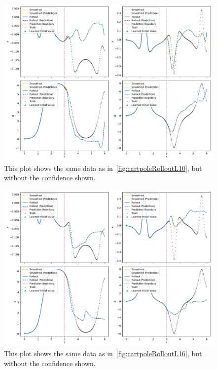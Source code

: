	\begin{figure}
		\centering
		\includegraphics[width=\linewidth]{figures/results/cartpole-gym/run-latent-dim-10/without-confidence/rollout-observations-N0.pdf}
		\caption{This plot shows the same data as in~\autoref{fig:cartpoleRolloutL10}, but without the confidence shown.}
		\label{fig:cartpoleRolloutL10Appendix}
	\end{figure}

	\begin{figure}
		\centering
		\includegraphics[width=\linewidth]{figures/results/cartpole-gym/run-latent-dim-16/without-confidence/rollout-observations-N0.pdf}
		\caption{This plot shows the same data as in~\autoref{fig:cartpoleRolloutL16}, but without the confidence shown.}
		\label{fig:cartpoleRolloutL16Appendix}
	\end{figure}
